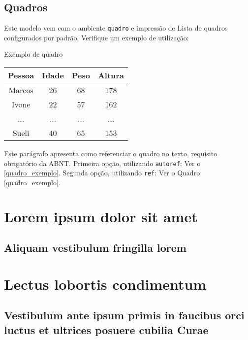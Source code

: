 \documentclass[
	12pt,				%
	openright,			%
    oneside,
	a4paper,			%
	chapter=TITLE,
	english,			%
	brazil				%
	]{abntex2}
\begin{document}
\section{Quadros}

Este modelo vem com o ambiente \texttt{quadro} e impressão de Lista de quadros 
configurados por padrão. Verifique um exemplo de utilização:

\begin{quadro}[htb]
\caption{\label{quadro_exemplo}Exemplo de quadro}
\begin{tabular}{|c|c|c|c|}
	\hline
	\textbf{Pessoa} & \textbf{Idade} & \textbf{Peso} & \textbf{Altura} \\ \hline
	Marcos & 26    & 68   & 178    \\ \hline
	Ivone  & 22    & 57   & 162    \\ \hline
	...    & ...   & ...  & ...    \\ \hline
	Sueli  & 40    & 65   & 153    \\ \hline
\end{tabular}
\end{quadro}

Este parágrafo apresenta como referenciar o quadro no texto, requisito
obrigatório da ABNT. 
Primeira opção, utilizando \texttt{autoref}: Ver o \autoref{quadro_exemplo}. 
Segunda opção, utilizando  \texttt{ref}: Ver o Quadro \ref{quadro_exemplo}.

\chapter{Lorem ipsum dolor sit amet}

\section{Aliquam vestibulum fringilla lorem}

\lipsum[1]

\lipsum[2-3]

\chapter{Lectus lobortis condimentum}

\section{Vestibulum ante ipsum primis in faucibus orci luctus et ultrices
posuere cubilia Curae}
\end{document}
